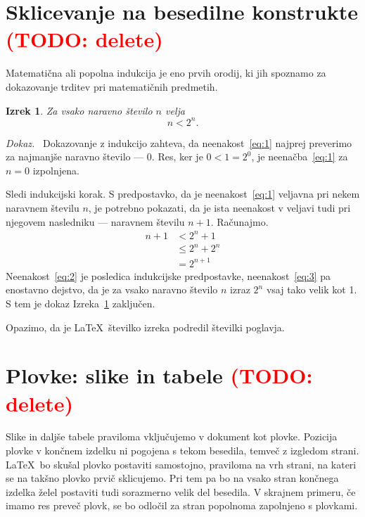 \documentclass[a4paper, 12pt]{book}
\newcommand{\TODO}[1]{\textcolor{red}{(TODO: #1)}}
\newtheorem{izrek}{Izrek}[chapter]
\newenvironment{dokaz}{\emph{Dokaz.}\ }{\hspace{\fill}{$\Box$}}
\begin{document}
\chapter*{Sklicevanje na besedilne konstrukte \TODO{delete}}


\label{ch1}
Matematična ali popolna indukcija je eno prvih orodij, ki jih spoznamo za dokazovanje trditev pri matematičnih predmetih. 
\begin{izrek}
\label{iz:1}
Za vsako naravno število $n$ velja
\begin{equation}
n < 2^n.
\label{eq:1}
\end{equation}
\end{izrek}
\begin{dokaz}
Dokazovanje z indukcijo zahteva, da neenakost~\eqref{eq:1} najprej preverimo
za najmanjše naravno število --- $0$. Res, ker je $0 < 1 = 2^0$, je
neenačba~\eqref{eq:1} za $n=0$ izpolnjena.

Sledi indukcijski korak. S predpostavko, da je neenakost~\eqref{eq:1} veljavna
pri nekem naravnem številu $n$, je potrebno pokazati, da je ista neenakost v
veljavi tudi pri njegovem nasledniku --- naravnem številu $n+1$. Računajmo.
\begin{align}
n+1 &< 2^n + 1  \label{eq:2}\\
    &\le 2^n + 2^n \label{eq:3}\\
    &= 2^{n+1} \nonumber
\end{align} 
Neenakost~\eqref{eq:2} je posledica indukcijske predpostavke,
neenakost~\eqref{eq:3} pa enostavno dejstvo, da je za vsako naravno število $n$
izraz $2^n$ vsaj tako velik kot 1. S tem je dokaz Izreka~\ref{iz:1} zaključen.
\end{dokaz}

Opazimo, da je \LaTeX\ številko izreka podredil številki poglavja.



\chapter*{Plovke: slike in tabele \TODO{delete}}
\label{ch2}
Slike in daljše tabele praviloma vključujemo v dokument kot plovke. Pozicija plovke v končnem izdelku ni pogojena s tekom besedila, temveč z izgledom strani. \LaTeX\ bo skušal plovko postaviti samostojno, praviloma na vrh strani, na kateri se na takšno plovko prvič sklicujemo. Pri tem pa bo na vsako stran končnega izdelka želel postaviti tudi sorazmerno velik del besedila. V skrajnem primeru, če imamo res preveč plovk, se bo odločil za stran popolnoma zapolnjeno s plovkami.
\end{document}
